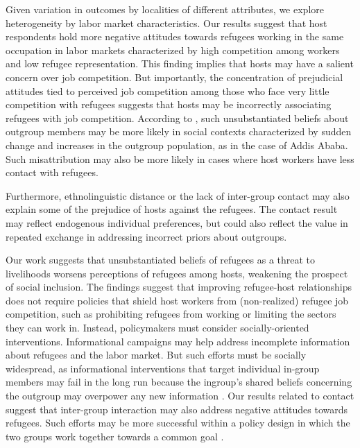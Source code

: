 \documentclass[a4paper,12pt]{article}
\begin{document}
Given variation in outcomes by localities of different attributes, we explore heterogeneity by labor market characteristics. Our results suggest that host respondents hold more negative attitudes towards refugees working in the same occupation in labor markets characterized by high competition among workers and low refugee representation. This finding implies that hosts may have a salient concern over job competition. But importantly, the concentration of prejudicial attitudes tied to perceived job competition among those who face very little competition with refugees suggests that hosts may be incorrectly associating refugees with job competition. According to \cite{allport1954nature}, such unsubstantiated beliefs about outgroup members may be more likely in social contexts characterized by sudden change and increases in the outgroup population, as in the case of Addis Ababa. Such misattribution may also be more likely in cases where host workers have less contact with refugees. 

Furthermore, ethnolinguistic distance or the lack of inter-group contact may also explain some of the prejudice of hosts against the refugees. The contact result may reflect endogenous individual preferences, but could also reflect the value in repeated exchange in addressing incorrect priors about outgroups.

Our work suggests that unsubstantiated beliefs of refugees as a threat to livelihoods worsens perceptions of refugees among hosts, weakening the prospect of social inclusion. The findings suggest that improving refugee-host relationships does not require policies that shield host workers from (non-realized) refugee job competition, such as prohibiting refugees from working or limiting the sectors they can work in. Instead, policymakers must consider socially-oriented interventions. Informational campaigns may help address incomplete information about refugees and the labor market. But such efforts must be socially widespread, as informational interventions that target individual in-group members may fail in the long run because the ingroup's shared beliefs concerning the outgroup may overpower any new information \citep{allport1954nature}. Our results related to contact suggest that inter-group interaction may also address negative attitudes towards refugees. Such efforts may be more successful within a policy design in which the two groups work together towards a common goal \citep{barros2023power}.
\end{document}
